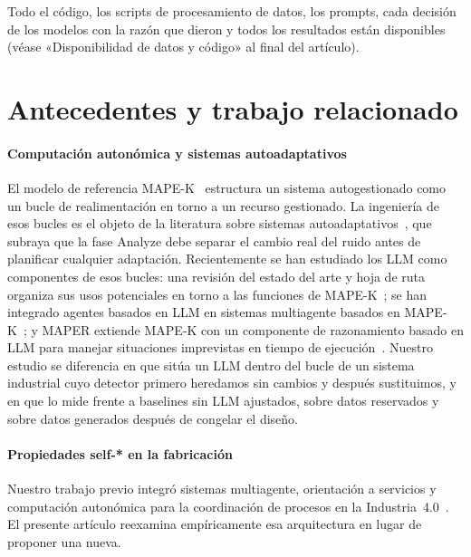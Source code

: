 \documentclass[preprint,11pt]{elsarticle}
\begin{document}
Todo el código, los scripts de procesamiento de datos, los prompts, cada decisión de los modelos con la razón que dieron y todos los resultados están disponibles (véase «Disponibilidad de datos y código» al final del artículo).

\section{Antecedentes y trabajo relacionado}
\label{sec:related}

\paragraph{Computación autonómica y sistemas autoadaptativos}
El modelo de referencia MAPE-K~\cite{kephart2003vision} estructura un sistema autogestionado como un bucle de realimentación en torno a un recurso gestionado. La ingeniería de esos bucles es el objeto de la literatura sobre sistemas autoadaptativos~\cite{weyns2020introduction}, que subraya que la fase Analyze debe separar el cambio real del ruido antes de planificar cualquier adaptación. Recientemente se han estudiado los LLM como componentes de esos bucles: una revisión del estado del arte y hoja de ruta organiza sus usos potenciales en torno a las funciones de MAPE-K~\cite{li2024genai,li2024exploring}; se han integrado agentes basados en LLM en sistemas multiagente basados en MAPE-K~\cite{nascimento2023selfadaptive}; y MAPER extiende MAPE-K con un componente de razonamiento basado en LLM para manejar situaciones imprevistas en tiempo de ejecución~\cite{alves2026maper}. Nuestro estudio se diferencia en que sitúa un LLM dentro del bucle de un sistema industrial cuyo detector primero heredamos sin cambios y después sustituimos, y en que lo mide frente a baselines sin LLM ajustados, sobre datos reservados y sobre datos generados después de congelar el diseño.

\paragraph{Propiedades self-* en la fabricación}
Nuestro trabajo previo integró sistemas multiagente, orientación a servicios y computación autonómica para la coordinación de procesos en la Industria~4.0~\cite{sanchez2020selfstar,sanchez2020jii,sanchez2020survey}. El presente artículo reexamina empíricamente esa arquitectura en lugar de proponer una nueva.
\end{document}
